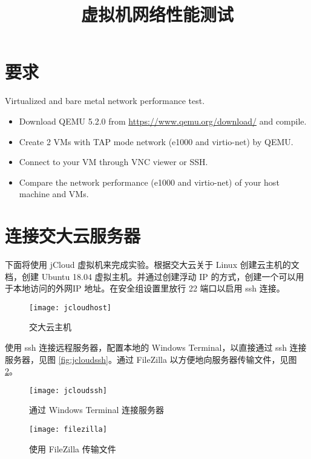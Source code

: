 

    \title{虚拟机网络性能测试}
    \maketitle
    \section*{要求}
    Virtualized and bare metal network performance test.
    \begin{itemize}
        \item Download QEMU 5.2.0 from \href{https://www.qemu.org/download/}{https://www.qemu.org/download/} and compile.
        \item Create 2 VMs with TAP mode network (e1000 and virtio-net) by QEMU.
        \item Connect to your VM through VNC viewer or SSH.
        \item Compare the network performance (e1000 and virtio-net) of your host machine and VMs.
    \end{itemize}
    \section{连接交大云服务器}
    下面将使用 jCloud 虚拟机来完成实验。根据交大云关于 Linux 创建云主机的文档\cite{jcloudlinux}，创建 Ubuntu 18.04 虚拟主机。并通过创建浮动 IP 的方式，创建一个可以用于本地访问的外网IP 地址。在安全组设置里放行 22 端口以启用 ssh 连接。

    \begin{figure}[H]
        \centering
        \texttt{[image: jcloudhost]}
        \caption{交大云主机}\label{fig:jcloudhost}
    \end{figure}

    使用 ssh 连接远程服务器\cite{jcloudssh}，配置本地的 Windows Terminal\cite{winssh}，以直接通过 ssh 连接服务器，见图 \ref{fig:jcloudssh}。通过 FileZilla 以方便地向服务器传输文件，见图 \ref{fig:filezilla}。

    \begin{figure}[H]
        \centering
        \begin{minipage}{0.48\textwidth}
            \centering
            \texttt{[image: jcloudssh]}
            \caption{通过 Windows Terminal 连接服务器}\label{fig:jcloudssh}
        \end{minipage}
        \begin{minipage}{0.48\textwidth}
            \centering
            \texttt{[image: filezilla]}
            \caption{使用 FileZilla 传输文件}\label{fig:filezilla}
        \end{minipage}
    \end{figure}


